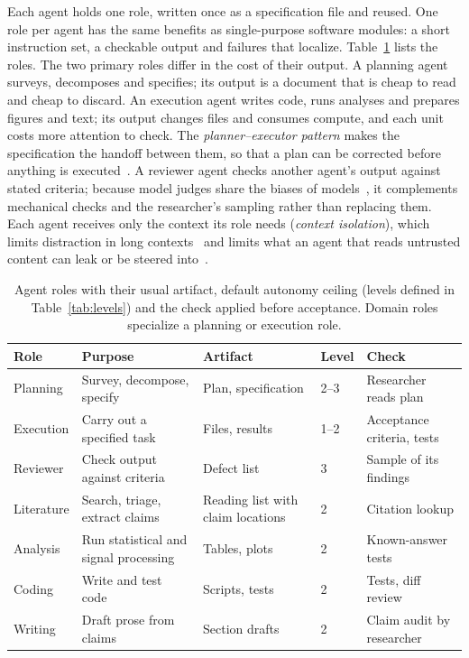 Each agent holds one role, written once as a specification file and reused. One role
per agent has the same benefits as single-purpose software modules: a short instruction
set, a checkable output and failures that localize. Table~\ref{tab:roles} lists the
roles. The two primary roles differ in the cost of their output. A planning agent
surveys, decomposes and specifies; its output is a document that is cheap to read and
cheap to discard. An execution agent writes code, runs analyses and prepares figures and
text; its output changes files and consumes compute, and each unit costs more attention
to check. The \textit{planner--executor pattern} makes the specification the handoff
between them, so that a plan can be corrected before anything is
executed~\cite{shen2023hugginggpt,wang2023planandsolve,schluntz2024building}.
A reviewer agent checks another agent's output against stated criteria; because model
judges share the biases of models~\cite{zheng2023judging}, it complements mechanical
checks and the researcher's sampling rather than replacing them. Each agent receives
only the context its role needs (\textit{context isolation}), which limits distraction
in long contexts~\cite{liu2024lost} and limits what an agent that reads untrusted
content can leak or be steered into~\cite{greshake2023injection}.

\begin{table}[htbp]
  \centering
  \caption{Agent roles with their usual artifact, default autonomy ceiling (levels
  defined in Table~\ref{tab:levels}) and the check applied before acceptance. Domain
  roles specialize a planning or execution role.}
  \label{tab:roles}
  \small
  \begin{tabular}{L{2.6cm}L{4.3cm}L{2.9cm}C{1.3cm}L{3.0cm}}
    \toprule
    Role & Purpose & Artifact & Level & Check \\
    \midrule
    Planning & Survey, decompose, specify & Plan, specification & 2--3 & Researcher reads plan \\
    Execution & Carry out a specified task & Files, results & 1--2 & Acceptance criteria, tests \\
    Reviewer & Check output against criteria & Defect list & 3 & Sample of its findings \\
    \midrule
    Literature & Search, triage, extract claims & Reading list with claim locations & 2 & Citation lookup \\
    Analysis & Run statistical and signal processing & Tables, plots & 2 & Known-answer tests \\
    Coding & Write and test code & Scripts, tests & 2 & Tests, diff review \\
    Writing & Draft prose from claims & Section drafts & 2 & Claim audit by researcher \\
    \bottomrule
  \end{tabular}
\end{table}

